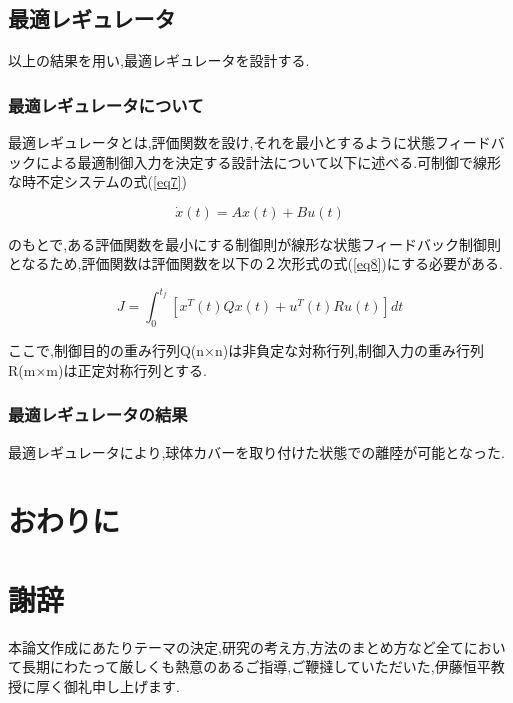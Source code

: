 \documentclass[12pt,oneside]{sotsuken_paper}
\begin{document}
\section{最適レギュレータ}
以上の結果を用い,最適レギュレータを設計する.

\subsection{最適レギュレータについて}

最適レギュレータとは,評価関数を設け,それを最小とするように状態フィードバックによる最適制御入力を決定する設計法について以下に述べる.可制御で線形な時不定システムの式(\ref{eq7})

\begin{equation}
	\dot{x}(t) = Ax(t)+Bu(t)
	\label{eq7}
\end{equation}

のもとで,ある評価関数を最小にする制御則が線形な状態フィードバック制御則となるため,評価関数は評価関数を以下の２次形式の式(\ref{eq8})にする必要がある.

\begin{equation}
	J = \int^{t_f}_0 [x^T(t)Qx(t)+u^T(t)Ru(t)]dt
	\label{eq8}
\end{equation}

ここで,制御目的の重み行列Q(n×n)は非負定な対称行列,制御入力の重み行列R(m×m)は正定対称行列とする.\cite{regyu}

\subsection{最適レギュレータの結果}
最適レギュレータにより,球体カバーを取り付けた状態での離陸が可能となった.


\chapter{おわりに}


\chapter*{謝辞}
本論文作成にあたりテーマの決定,研究の考え方,方法のまとめ方など全てにおいて長期にわたって厳しくも熱意のあるご指導,ご鞭撻していただいた,伊藤恒平教授に厚く御礼申し上げます.
\end{document}
